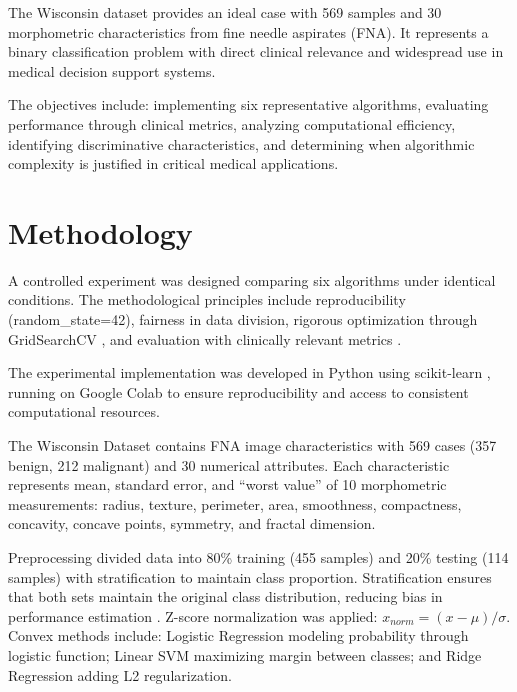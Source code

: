 \documentclass[conference]{IEEEtran}
\begin{document}
The Wisconsin dataset \cite{wolberg1995} provides an ideal case with 569 samples and 30 morphometric characteristics from fine needle aspirates (FNA). It represents a binary classification problem with direct clinical relevance and widespread use in medical decision support systems.

The objectives include: implementing six representative algorithms, evaluating performance through clinical metrics, analyzing computational efficiency, identifying discriminative characteristics, and determining when algorithmic complexity is justified in critical medical applications.

\section{Methodology}

A controlled experiment was designed comparing six algorithms under identical conditions. The methodological principles include reproducibility (random\_state=42), fairness in data division, rigorous optimization through GridSearchCV \cite{bergstra2012}, and evaluation with clinically relevant metrics \cite{fawcett2006}.

The experimental implementation was developed in Python using scikit-learn \cite{pedregosa2011}, running on Google Colab to ensure reproducibility and access to consistent computational resources.

The Wisconsin Dataset \cite{street1993} contains FNA image characteristics with 569 cases (357 benign, 212 malignant) and 30 numerical attributes. Each characteristic represents mean, standard error, and ``worst value'' of 10 morphometric measurements: radius, texture, perimeter, area, smoothness, compactness, concavity, concave points, symmetry, and fractal dimension.

Preprocessing divided data into 80\% training (455 samples) and 20\% testing (114 samples) with stratification \cite{kohavi1995} to maintain class proportion. Stratification ensures that both sets maintain the original class distribution, reducing bias in performance estimation \cite{kohavi1995}. Z-score normalization \cite{jain2005} was applied: $x_{norm} = (x - \mu)/\sigma$.\\

Convex methods \cite{boyd2004} include: Logistic Regression modeling probability through logistic function; Linear SVM \cite{vapnik1995} maximizing margin between classes; and Ridge Regression \cite{hoerl1970} adding L2 regularization.
\end{document}
